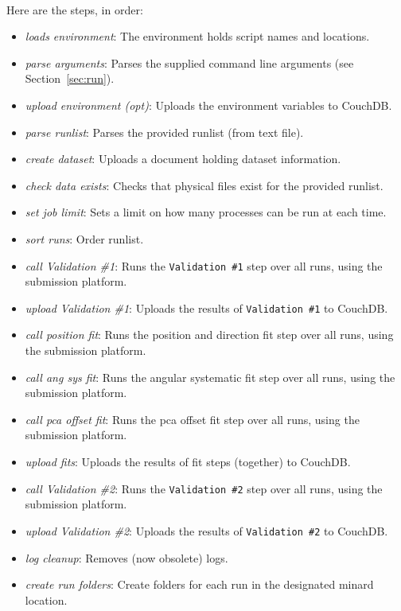 \documentclass[12pt]{article}
\begin{document}
\paragraph{}
Here are the steps, in order:
\begin{itemize}
	\item \textit{loads environment}: The environment holds script names and locations.
	\item \textit{parse arguments}: Parses the supplied command line arguments (see Section~\ref{sec:run}).
	\item \textit{upload environment (opt)}: Uploads the environment variables to CouchDB.  
	\item \textit{parse runlist}: Parses the provided runlist (from text file). 
	\item \textit{create dataset}: Uploads a document holding dataset information. 
	\item \textit{check data exists}: Checks that physical files exist for the provided runlist. 
	\item \textit{set job limit}: Sets a limit on how many processes can be run at each time. 
	\item \textit{sort runs}: Order runlist. 
	\item \textit{call Validation \#1}: Runs the \texttt{Validation \#1} step over all runs, using the submission platform. 
	\item \textit{upload Validation \#1}: Uploads the results of \texttt{Validation \#1} to CouchDB.
	\item \textit{call position fit}: Runs the position and direction fit step over all runs, using the submission platform. 
	\item \textit{call ang sys fit}: Runs the angular systematic fit step over all runs, using the submission platform. 
	\item \textit{call pca offset fit}: Runs the pca offset fit step over all runs, using the submission platform. 
	\item \textit{upload fits}: Uploads the results of fit steps (together) to CouchDB.
	\item \textit{call Validation \#2}: Runs the \texttt{Validation \#2} step over all runs, using the submission platform. 
	\item \textit{upload Validation \#2}: Uploads the results of \texttt{Validation \#2} to CouchDB.
	\item \textit{log cleanup}: Removes (now obsolete) logs.
	\item \textit{create run folders}: Create folders for each run in the designated minard location. 

\end{itemize}
\end{document}
